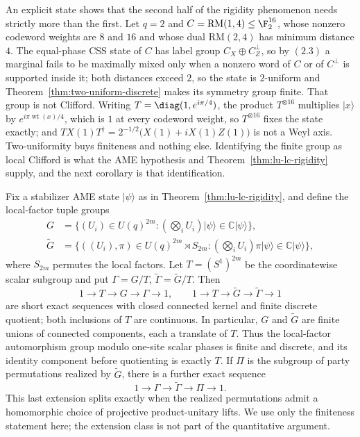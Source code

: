\begin{remark}
\label{rem:two-uniform-not-clifford}
An explicit state shows that the second half of the rigidity phenomenon
needs strictly more than the first.  Let \(q=2\) and
\(C=\mathrm{RM}(1,4)\leq\F_2^{16}\), whose nonzero codeword weights are
\(8\) and \(16\) and whose dual \(\mathrm{RM}(2,4)\) has minimum distance
\(4\).  The equal-phase CSS state of \(C\) has label group
\(C_X\oplus C^\perp_Z\), so by \((2.3)\) a marginal fails to be maximally
mixed only when a nonzero word of \(C\) or of \(C^\perp\) is supported
inside it; both distances exceed \(2\), so the state is \(2\)-uniform and
Theorem~\ref{thm:two-uniform-discrete} makes its symmetry group finite.
That group is not Clifford.  Writing \(T=\diag(1,e^{i\pi/4})\), the product
\(T^{\otimes16}\) multiplies \(\lvert x\rangle\) by
\(e^{i\pi\operatorname{wt}(x)/4}\), which is \(1\) at every codeword
weight, so \(T^{\otimes16}\) fixes the state exactly; and
\(TX(1)T^\dagger=2^{-1/2}\bigl(X(1)+iX(1)Z(1)\bigr)\) is not a Weyl axis.
Two-uniformity buys finiteness and nothing else.  Identifying the finite
group as local Clifford is what the AME hypothesis and
Theorem~\ref{thm:lu-lc-rigidity} supply, and the next corollary is that
identification.
\end{remark}

\begin{corollary}
\label{cor:discrete-lu-symmetry}
Fix a stabilizer AME state \(\lvert\psi\rangle\) as in
Theorem~\ref{thm:lu-lc-rigidity}, and define the local-factor tuple groups
\[
\begin{split}
G&=\{(U_i)\in U(q)^{2m}:
       (\bigotimes_iU_i)\lvert\psi\rangle
          \in\mathbb C\lvert\psi\rangle\},\\
\widetilde G
 &=\{((U_i),\pi)\in U(q)^{2m}\rtimes S_{2m}:
       (\bigotimes_iU_i)\pi\lvert\psi\rangle
          \in\mathbb C\lvert\psi\rangle\},
\end{split}
\]
where \(S_{2m}\) permutes the local factors.  Let
\(T=(S^1)^{2m}\) be the coordinatewise scalar subgroup and put
\(\Gamma=G/T\), \(\widetilde\Gamma=\widetilde G/T\).  Then
\[
  1\longrightarrow T\longrightarrow G\longrightarrow \Gamma
    \longrightarrow 1,
  \qquad
  1\longrightarrow T\longrightarrow \widetilde G
    \longrightarrow \widetilde\Gamma\longrightarrow 1
\]
are short exact sequences with closed connected kernel and finite
discrete quotient; both inclusions of \(T\) are continuous.  In
particular, \(G\) and \(\widetilde G\) are finite unions of connected
components, each a translate of \(T\).  Thus the local-factor
automorphism group modulo one-site scalar phases is finite and discrete,
and its identity component before quotienting is exactly \(T\).
If \(\Pi\) is the subgroup of
party permutations realized by \(\widetilde G\), there is a further exact
sequence
\[
  1\longrightarrow \Gamma\longrightarrow\widetilde\Gamma
    \longrightarrow\Pi\longrightarrow 1.
\]
This last extension splits exactly when the realized permutations admit a
homomorphic choice of projective product-unitary lifts.  We use only the
finiteness statement here; the extension class is not part of the
quantitative argument.
\end{corollary}

